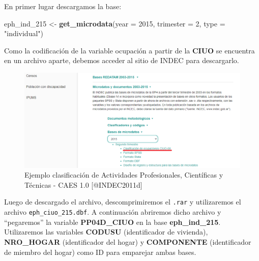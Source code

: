 \documentclass[
]{article}
\newenvironment{Shaded}{\begin{snugshade}}{\end{snugshade}}
\newcommand{\AttributeTok}[1]{\textcolor[rgb]{0.13,0.29,0.53}{#1}}
\newcommand{\DecValTok}[1]{\textcolor[rgb]{0.00,0.00,0.81}{#1}}
\newcommand{\FunctionTok}[1]{\textcolor[rgb]{0.13,0.29,0.53}{\textbf{#1}}}
\newcommand{\NormalTok}[1]{#1}
\newcommand{\OtherTok}[1]{\textcolor[rgb]{0.56,0.35,0.01}{#1}}
\newcommand{\StringTok}[1]{\textcolor[rgb]{0.31,0.60,0.02}{#1}}
\begin{document}
En primer lugar descargamos la base:

\begin{Shaded}
\begin{Highlighting}[]
\NormalTok{eph\_ind\_215 }\OtherTok{\textless{}{-}} \FunctionTok{get\_microdata}\NormalTok{(}\AttributeTok{year =} \DecValTok{2015}\NormalTok{, }\AttributeTok{trimester =} \DecValTok{2}\NormalTok{, }\AttributeTok{type =} \StringTok{"individual"}\NormalTok{)}
\end{Highlighting}
\end{Shaded}

Como la codificación de la variable ocupación a partir de la \textbf{CIUO} se encuentra en un archivo aparte, debemos acceder al sitio de INDEC para descargarlo.

\begin{figure}

{\centering \includegraphics[width=0.8\linewidth]{imagenes/indec_ciuo} 

}

\caption{Ejemplo clasificación de Actividades Profesionales, Científicas y Técnicas - CAES 1.0 [@INDEC2011d]}\label{fig:unnamed-chunk-41}
\end{figure}

Luego de descargado el archivo, descomprimiremos el \texttt{.rar} y utilizaremos el archivo \texttt{eph\_ciuo\_215.dbf}. A continuación abriremos dicho archivo y ``pegaremos'' la variable \textbf{PP04D\_CIUO} en la base \textbf{eph\_ind\_215}. Utilizaremos las variables \textbf{CODUSU} (identificador de vivienda), \textbf{NRO\_HOGAR} (identificador del hogar) y \textbf{COMPONENTE} (identificador de miembro del hogar) como ID para emparejar ambas bases.
\end{document}
